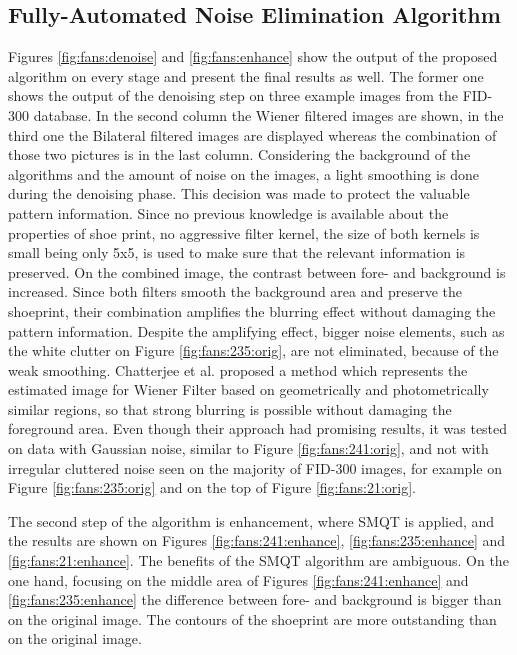 \documentclass[draft,final]{vutinfth} %
\begin{document}
\subsection{Fully-Automated Noise Elimination Algorithm}
\par
Figures \ref{fig:fans:denoise} and \ref{fig:fans:enhance} show the output of the proposed algorithm on every stage and present the final results as well.
The former one shows the output of the denoising step on three example images from the FID-300 database.
In the second column the Wiener filtered images are shown, in the third one the Bilateral filtered images are displayed whereas the combination of those two pictures is in the last column.
Considering the background of the algorithms and the amount of noise on the images, a light smoothing is done during the denoising phase.
This decision was made to protect the valuable pattern information.
Since no previous knowledge is available about the properties of shoe print, no aggressive filter kernel, the  size of both kernels is small being only 5x5, is used to make sure that the relevant information is preserved.
On the combined image, the contrast between fore- and background is increased.
Since both filters smooth the background area and preserve the shoeprint, their combination amplifies the blurring effect without damaging the pattern information. 
Despite the amplifying effect, bigger noise elements, such as the white clutter on Figure \ref{fig:fans:235:orig}, are not eliminated, because of the weak smoothing.  
Chatterjee et al. \cite{chatterjee2011patch} proposed a method which represents the estimated image for Wiener Filter based on geometrically and photometrically similar regions, so that strong blurring is possible without damaging the foreground area.
Even though their approach had promising results, it was tested on data with Gaussian noise, similar to Figure \ref{fig:fans:241:orig}, and not with irregular cluttered noise seen on the majority of FID-300 images, for example on Figure \ref{fig:fans:235:orig} and on the top of Figure \ref{fig:fans:21:orig}.
\par
The second step of the algorithm is enhancement, where SMQT is applied, and the results are shown on Figures \ref{fig:fans:241:enhance}, \ref{fig:fans:235:enhance} and \ref{fig:fans:21:enhance}.
The benefits of the SMQT algorithm are ambiguous.
On the one hand, focusing on the middle area of Figures  \ref{fig:fans:241:enhance} and \ref{fig:fans:235:enhance} the difference between fore- and background is bigger than on the original image.
The contours of the shoeprint are more outstanding than on the original image.
\end{document}
